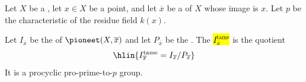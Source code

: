 \begin{definition} \label{definition:tame_inertia_subgroup_of_etale_fundamental_group_of_connected_scheme_at_geometric_point}
    Let $X$ be a  , let $x \in X$ be a point, and let $\overline{x}$ be a  of $X$ whose image is $x$. Let $p$ be the characteristic of the residue field $k(x)$.

    Let $I_{\overline{x}}$ be the  of $\pioneet(X, \overline{x})$ and let $P_{\overline{x}}$ be the .
    The  \hl{$I_{\overline{x}}^{\text{tame}}$} is the quotient
    $$\hlin{I_{\overline{x}}^{\text{tame}} = I_{\overline{x}} / P_{\overline{x}}}$$
    It is a procyclic pro-prime-to-$p$ group.
\end{definition}
